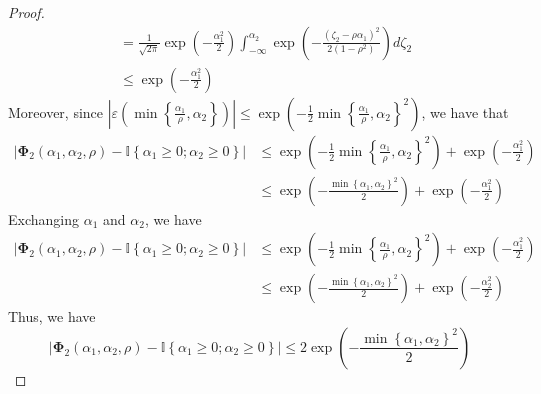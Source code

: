 \documentclass[10pt]{article} %
\theoremstyle{definition}
\theoremstyle{plain}
\newcommand{\paren}[1]{\left(#1\right)}
\begin{document}
\begin{proof}
\begin{align*}
        & = \frac{1}{\sqrt{2\pi}}\exp\paren{-\frac{\alpha_1^2}{2}}\int_{-\infty}^{\alpha_2}\exp\paren{-\frac{\paren{\zeta_2 - \rho\alpha_1}^2}{2\paren{1-\rho^2}}}d\zeta_2\\
        & \leq \exp\paren{-\frac{\alpha_1^2}{2}}
    \end{align*}
    Moreover, since $\left|\varepsilon\paren{\min\left\{\frac{\alpha_1}{\rho},\alpha_2\right\}}\right|\leq \exp\paren{-\frac{1}{2}\min\left\{\frac{\alpha_1}{\rho},\alpha_2\right\}^2}$, we have that
    \begin{align*}
        \left|\bm{\Phi}_2\paren{\alpha_1,\alpha_2,\rho} - \mathbb{I}\left\{\alpha_1\geq 0;\alpha_2\geq 0\right\}\right| & \leq \exp\paren{-\frac{1}{2}\min\left\{\frac{\alpha_1}{\rho},\alpha_2\right\}^2} + \exp\paren{-\frac{\alpha_1^2}{2}}\\
        & \leq \exp\paren{-\frac{\min\left\{\alpha_1,\alpha_2\right\}^2}{2}} + \exp\paren{-\frac{\alpha_1^2}{2}}
    \end{align*}
    Exchanging $\alpha_1$ and $\alpha_2$, we have
    \begin{align*}
        \left|\bm{\Phi}_2\paren{\alpha_1,\alpha_2,\rho} - \mathbb{I}\left\{\alpha_1\geq 0;\alpha_2\geq 0\right\}\right| & \leq \exp\paren{-\frac{1}{2}\min\left\{\frac{\alpha_1}{\rho},\alpha_2\right\}^2} + \exp\paren{-\frac{\alpha_1^2}{2}}\\
        & \leq \exp\paren{-\frac{\min\left\{\alpha_1,\alpha_2\right\}^2}{2}} + \exp\paren{-\frac{\alpha_2^2}{2}}
    \end{align*}
    Thus, we have
    \[
        \left|\bm{\Phi}_2\paren{\alpha_1,\alpha_2,\rho} - \mathbb{I}\left\{\alpha_1\geq 0;\alpha_2\geq 0\right\}\right| \leq 2\exp\paren{-\frac{\min\left\{\alpha_1,\alpha_2\right\}^2}{2}}
    \]
\end{proof}
\end{document}
